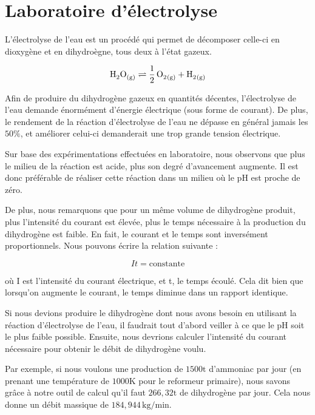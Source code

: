 \documentclass[a4paper, oneside, 12pt]{article}
\begin{document}
\section{Laboratoire d’électrolyse}

L'électrolyse de l'eau est un procédé qui permet de décomposer 
celle-ci en dioxygène et en dihydroègne, tous deux à l'état gazeux.

\begin{equation*}
	\ce{H2O_{(g)} \rightleftharpoons \frac{1}{2} \, O2_{(g)} + H2_{(g)}} 
\end{equation*}

Afin de produire du dihydrogène gazeux en quantités décentes, l'électrolyse de l'eau 
demande énormément d'énergie électrique (sous forme de courant). De plus, le rendement
de la réaction d'électrolyse de l'eau ne dépasse en général jamais les $50\%$, 
et améliorer celui-ci demanderait une trop grande tension électrique.

Sur base des expérimentations effectuées en laboratoire, nous observons que plus 
le milieu de la réaction est acide, plus son degré d'avancement augmente. Il est donc
préférable de réaliser cette réaction dans un milieu où le pH est proche de zéro.

De plus, nous remarquons que pour un même volume de dihydrogène produit, 
plus l’intensité du courant est élevée, plus le temps nécessaire à la production
du dihydrogène est faible. En fait, le courant et le temps sont inversément proportionnels.
Nous pouvons écrire la relation suivante :

\begin{equation*}
	It = \text{constante}
\end{equation*}

où I est l'intensité du courant électrique, et t, le temps écoulé. 
Cela dit bien que lorsqu'on augmente le courant, le temps diminue dans un rapport identique.

Si nous devions produire le dihydrogène dont nous avons besoin en utilisant la réaction 
d'électrolyse de l'eau, il faudrait tout d'abord veiller à ce que le pH soit le
plus faible possible. Ensuite, nous devrions calculer l'intensité du courant 
nécessaire pour obtenir le débit de dihydrogène voulu.

Par exemple, si nous voulons une production de $1500 \si{\tonne}$ d'ammoniac 
par jour (en prenant une température de $1000 \si{\kelvin}$ pour le reformeur primaire), 
nous savons grâce à notre outil de calcul qu'il faut $266,32 \si{\tonne}$ de dihydrogène 
par jour. Cela nous donne un débit massique de $184,944 \, \si{\kilo\gram/\minute}$.
\end{document}
